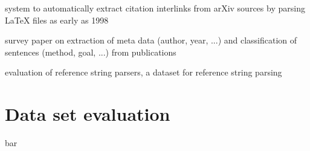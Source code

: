 system to automatically extract citation interlinks from arXiv sources by parsing LaTeX files as early as 1998\cite{Nanba1998}

survey paper on extraction of meta data (author, year, ...) and classification of sentences (method, goal, ...) from publications\cite{Nasar2018}

evaluation of reference string parsers\cite{Tkaczyk2018}, a dataset for reference string parsing\cite{Anzaroot2013}

\section{Data set evaluation}
bar
